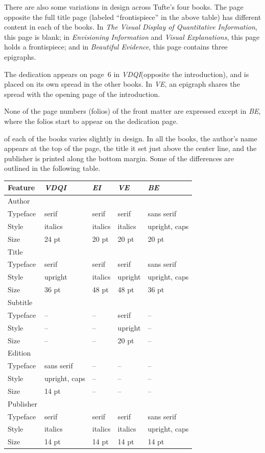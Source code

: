\documentclass{tufte-book} %
\newcommand{\na}{\quad--} %
\theoremstyle{definition}
\theoremstyle{theorem}
\theoremstyle{proposition}
\theoremstyle{lemma}
\theoremstyle{corolarry}
\newcommand{\vdqi}{\textit{VDQI}\xspace}
\newcommand{\ei}{\textit{EI}\xspace}
\newcommand{\ve}{\textit{VE}\xspace}
\newcommand{\be}{\textit{BE}\xspace}
\newcommand{\VDQI}{\textit{The Visual Display of Quantitative Information}\xspace}
\newcommand{\EI}{\textit{Envisioning Information}\xspace}
\newcommand{\VE}{\textit{Visual Explanations}\xspace}
\newcommand{\BE}{\textit{Beautiful Evidence}\xspace}
\begin{document}
There are also some variations in design across Tufte's four books. The page opposite the full title page (labeled ``frontispiece'' in the above table) has different content in each of the books. In \VDQI, this page is blank; in \EI and \VE, this page holds a frontispiece; and in \BE, this page contains three epigraphs.

The dedication appears on page~6 in \vdqi (opposite the introduction), and is placed on its own spread in the other books. In \ve, an epigraph shares the spread with the opening page of the introduction.

None of the page numbers (folios) of the front matter are expressed except in \be, where the folios start to appear on the dedication page.

 of each of the books varies slightly in design. In all the books, the author's name appears at the top of the page, the title it set just above the center line, and the publisher is printed along the bottom margin. Some of the differences are outlined in the following table.

\bigskip
\begin{center}
\footnotesize
\begin{tabular}{lllll}
\toprule
Feature & \vdqi & \ei & \ve & \be \\
\midrule
Author & & & & \\
\quad Typeface & serif & serif & serif & sans serif \\
\quad Style & italics & italics & italics & upright, caps \\
\quad Size & 24 pt & 20 pt & 20 pt & 20 pt \\
\addlinespace
Title & & & & \\
\quad Typeface & serif & serif & serif & sans serif \\
\quad Style & upright & italics & upright & upright, caps \\
\quad Size & 36 pt & 48 pt & 48 pt & 36 pt \\
\addlinespace
Subtitle & & & & \\
\quad Typeface & \na & \na & serif & \na \\
\quad Style & \na & \na & upright & \na \\
\quad Size & \na & \na & 20 pt & \na \\
\addlinespace
Edition & & & & \\
\quad Typeface & sans serif & \na & \na & \na \\
\quad Style & upright, caps & \na & \na & \na \\
\quad Size & 14 pt & \na & \na & \na \\
\addlinespace
Publisher & & & & \\
\quad Typeface & serif & serif & serif & sans serif \\
\quad Style & italics & italics & italics & upright, caps \\
\quad Size & 14 pt & 14 pt & 14 pt & 14 pt \\
\bottomrule
\end{tabular}
\end{center}
\end{document}
